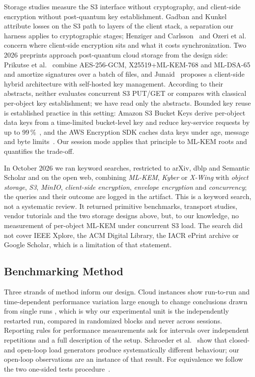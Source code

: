 \documentclass[review,12pt]{elsarticle}
\begin{document}
Storage studies measure the S3 interface without cryptography, and client-side encryption
without post-quantum key establishment. Gadban and Kunkel~\cite{gadban2021} attribute losses on
the S3 path to layers of the client stack, a separation our harness applies to cryptographic
stages; Henziger and Carlsson~\cite{henziger2019} and Ozeri et al.~\cite{ozeri2023} concern
where client-side encryption sits and what it costs synchronization. Two 2026 preprints
approach post-quantum cloud storage from the design side: Prikutse et
al.~\cite{prikutse2026} combine AES-256-GCM, X25519+ML-KEM-768 and ML-DSA-65 and amortize
signatures over a batch of files, and Junaid~\cite{junaid2026} proposes a client-side hybrid
architecture with self-hosted key management. According to their abstracts, neither evaluates
concurrent S3 PUT/GET or compares with classical per-object key establishment; we have read only
the abstracts. Bounded key reuse is established practice in this setting: Amazon S3 Bucket Keys
derive per-object data keys from a time-limited bucket-level key and reduce key-service requests
by up to 99\,\%~\cite{s3bucketkeys}, and the AWS Encryption SDK caches data keys under age,
message and byte limits~\cite{esdkcache}. Our session mode applies that principle to ML-KEM
roots and quantifies the trade-off.

In October 2026 we ran keyword searches, restricted to arXiv, dblp and Semantic Scholar and on
the open web, combining \emph{ML-KEM}, \emph{Kyber} or \emph{X-Wing} with \emph{object storage},
\emph{S3}, \emph{MinIO}, \emph{client-side encryption}, \emph{envelope encryption} and
\emph{concurrency}; the queries and their outcome are logged in the artifact. This is a keyword
search, not a systematic review. It returned primitive benchmarks, transport studies, vendor
tutorials and the two storage designs above, but, to our knowledge, no measurement of per-object
ML-KEM under concurrent S3 load. The search did not cover IEEE Xplore, the ACM Digital Library,
the IACR ePrint archive or Google Scholar, which is a limitation of that statement.

\subsection{Benchmarking Method}\label{sec:benchmethod}
Three strands of method inform our design. Cloud instances show run-to-run and time-dependent
performance variation large enough to change conclusions drawn from single runs
\cite{leitner2016,uta2020,maricq2018},
which is why our experimental unit is the independently restarted run, compared in randomized
blocks and never across sessions. Reporting rules for performance measurements
\cite{hoefler2015,kalibera2013}
ask for intervals over independent repetitions and a full description of the setup. Schroeder et
al.~\cite{schroeder2006} show that closed- and open-loop load generators produce systematically
different behaviour; our open-loop observations are an instance of that result. For equivalence
we follow the two one-sided tests procedure~\cite{schuirmann1987,lakens2017}.
\end{document}
